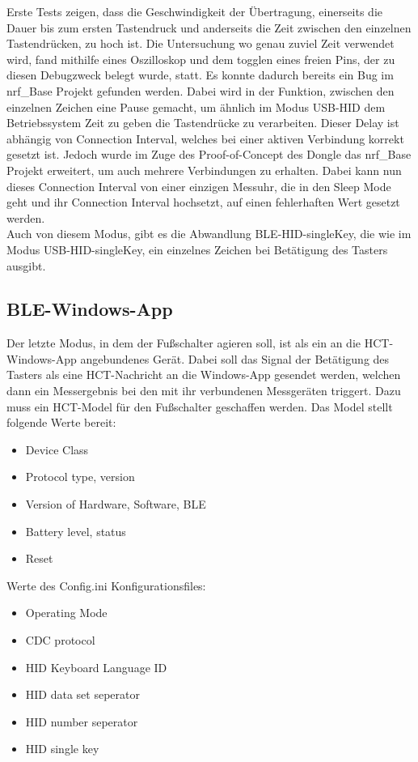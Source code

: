 Erste Tests zeigen, dass die Geschwindigkeit der Übertragung, einerseits die Dauer bis zum ersten Tastendruck und anderseits die Zeit zwischen den einzelnen Tastendrücken, zu hoch ist. Die Untersuchung wo genau zuviel Zeit verwendet wird, fand mithilfe eines Oszilloskop und dem togglen eines freien Pins, der zu diesen Debugzweck belegt wurde, statt. Es konnte dadurch bereits ein Bug im nrf\_Base Projekt gefunden werden. Dabei wird in der Funktion, zwischen den einzelnen Zeichen eine Pause gemacht, um ähnlich im Modus USB-HID dem Betriebssystem Zeit zu geben die Tastendrücke zu verarbeiten. Dieser Delay ist abhängig von Connection Interval, welches bei einer aktiven Verbindung korrekt gesetzt ist. Jedoch wurde im Zuge des Proof-of-Concept des Dongle das nrf\_Base Projekt erweitert, um auch mehrere Verbindungen zu erhalten. Dabei kann nun dieses Connection Interval von einer einzigen Messuhr, die in den Sleep Mode geht und ihr Connection Interval hochsetzt, auf einen fehlerhaften Wert gesetzt werden.\\
Auch von diesem Modus, gibt es die Abwandlung BLE-HID-singleKey, die wie im Modus USB-HID-singleKey, ein einzelnes Zeichen bei Betätigung des Tasters ausgibt.

\subsection{BLE-Windows-App}
Der letzte Modus, in dem der Fußschalter agieren soll, ist als ein an die HCT-Windows-App angebundenes Gerät. Dabei soll das Signal der Betätigung des Tasters als eine HCT-Nachricht an die Windows-App gesendet werden, welchen dann ein Messergebnis bei den mit ihr verbundenen Messgeräten triggert. Dazu muss ein HCT-Model für den Fußschalter geschaffen werden. Das Model stellt folgende Werte bereit:
\begin{itemize}
	\item Device Class
	\item Protocol type, version 
	\item Version of Hardware, Software, BLE
	\item Battery level, status
	\item Reset 
\end{itemize}

Werte des Config.ini Konfigurationsfiles:
\begin{itemize}
	\item Operating Mode 
	\item CDC protocol 
	\item HID Keyboard Language ID 
	\item HID data set seperator 
	\item HID number seperator
	\item HID single key 
\end{itemize}

